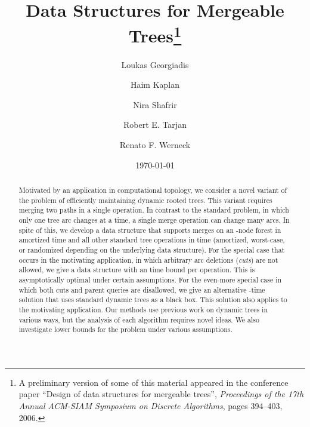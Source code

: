 \documentclass[twoside,leqno,twocolumn]{article}
\begin{document}
\title{\Large Data Structures for Mergeable Trees\footnote{A preliminary version of some of this material appeared in the conference paper ``Design of data structures for mergeable trees'', \emph{Proceedings of the 17th Annual ACM-SIAM Symposium on Discrete Algorithms}, pages 394--403, 2006.}}
\author{Loukas Georgiadis \and Haim Kaplan \and Nira Shafrir \and Robert E. Tarjan \and Renato F. Werneck}
\date{\today}

\maketitle




\begin{abstract} \small\baselineskip=9pt

Motivated by an application in computational topology, we consider a novel variant of the problem of efficiently maintaining dynamic rooted trees.  This variant requires merging two paths in a single operation.  In contrast to the standard problem, in which only one tree arc changes at a time, a single merge operation can change many arcs.  In spite of this, we develop a data structure that supports merges on an -node forest in  amortized time and all other standard tree operations in  time (amortized,  worst-case, or randomized depending on the underlying data structure).  For the special case that occurs in the motivating application, in which arbitrary arc deletions (\emph{cuts}) are not allowed, we give a data structure with an  time bound per operation.  This is asymptotically optimal under certain assumptions.  For the even-more special case in which both cuts and parent queries are disallowed, we give an alternative -time solution that uses standard dynamic trees as a black box. This solution also applies to the motivating application.  Our methods use previous work on dynamic trees in various ways, but the analysis of each algorithm requires novel ideas.  We also investigate lower bounds for the problem under various assumptions.
\end{abstract}


\end{document}
